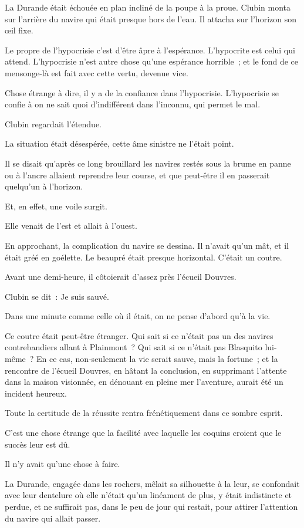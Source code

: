 \documentclass[french,twoside]{book} %
\begin{document}
La Durande était échouée en plan incliné de la poupe à la proue. Clubin monta sur l’arrière du navire qui était presque hors de l’eau. Il attacha sur l’horizon son œil fixe.\par
Le propre de l’hypocrisie c’est d’être âpre à l’espérance. L’hypocrite est celui qui attend. L’hypocrisie n’est autre chose qu’une espérance horrible ; et le fond de ce mensonge-là est fait avec cette vertu, devenue vice.\par
Chose étrange à dire, il y a de la confiance dans l’hypocrisie. L’hypocrisie se confie à on ne sait quoi d’indifférent dans l’inconnu, qui permet le mal.\par
Clubin regardait l’étendue.\par
La situation était désespérée, cette âme sinistre ne l’était point.\par
Il se disait qu’après ce long brouillard les navires restés sous la brume en panne ou à l’ancre allaient reprendre leur course, et que peut-être il en passerait quelqu’un à l’horizon.\par
Et, en effet, une voile surgit.\par
Elle venait de l’est et allait à l’ouest.\par
En approchant, la complication du navire se dessina. Il n’avait qu’un mât, et il était gréé en goélette. Le beaupré était presque horizontal. C’était un coutre.\par
 Avant une demi-heure, il côtoierait d’assez près l’écueil Douvres.\par
Clubin se dit : Je suis sauvé.\par
Dans une minute comme celle où il était, on ne pense d’abord qu’à la vie.\par
Ce coutre était peut-être étranger. Qui sait si ce n’était pas un des navires contrebandiers allant à Plainmont ? Qui sait si ce n’était pas Blasquito lui-même ? En ce cas, non-seulement la vie serait sauve, mais la fortune ; et la rencontre de l’écueil Douvres, en hâtant la conclusion, en supprimant l’attente dans la maison visionnée, en dénouant en pleine mer l’aventure, aurait été un incident heureux.\par
Toute la certitude de la réussite rentra frénétiquement dans ce sombre esprit.\par
C’est une chose étrange que la facilité avec laquelle les coquins croient que le succès leur est dû.\par
Il n’y avait qu’une chose à faire.\par
La Durande, engagée dans les rochers, mêlait sa silhouette à la leur, se confondait avec leur dentelure où elle n’était qu’un linéament de plus, y était indistincte et perdue, et ne suffirait pas, dans le peu de jour qui restait, pour attirer l’attention du navire qui allait passer.\par
\end{document}
